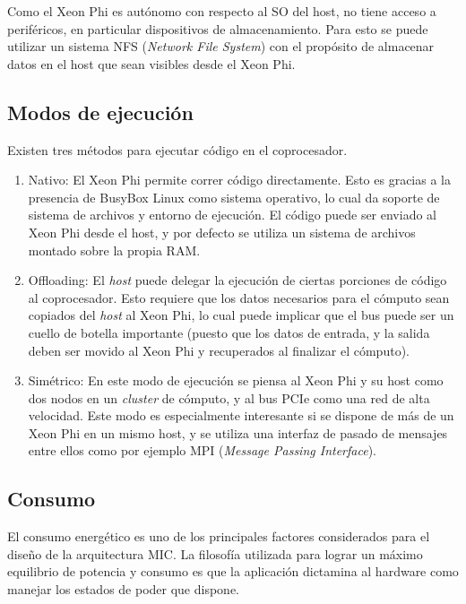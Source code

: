 Como el Xeon Phi es aut\'onomo con respecto al SO del host, no tiene acceso a perif\'ericos, en particular dispositivos de almacenamiento.
Para esto se puede utilizar un sistema NFS (\textit{Network File System}) con el prop\'osito de almacenar datos en el host que sean visibles
desde el Xeon Phi.

\subsection{Modos de ejecuci\'on}

Existen tres m\'etodos para ejecutar c\'odigo en el coprocesador.

\begin{enumerate}
    \item Nativo: El Xeon Phi permite correr c\'odigo directamente. Esto es gracias a la presencia de BusyBox Linux como sistema operativo,
    lo cual da soporte de sistema de archivos y entorno de ejecuci\'on. El c\'odigo puede ser enviado al Xeon Phi desde el host, y por defecto se utiliza un sistema
    de archivos montado sobre la propia RAM.
    \item Offloading: El \textit{host} puede delegar la ejecuci\'on de ciertas porciones de c\'odigo al coprocesador.
    Esto requiere que los datos necesarios para el c\'omputo sean copiados del \textit{host} al Xeon Phi, lo cual puede implicar que el bus puede ser un cuello de botella
    importante (puesto que los datos de entrada, y la salida deben ser movido al Xeon Phi y recuperados al finalizar el c\'omputo).
    \item Sim\'etrico: En este modo de ejecuci\'on se piensa al Xeon Phi y su host como dos nodos en un \textit{cluster} de c\'omputo, y al bus PCIe como una red de alta velocidad.
    Este modo es especialmente interesante si se dispone de m\'as de un Xeon Phi en un mismo host,
    y se utiliza una interfaz de pasado de mensajes entre ellos como por ejemplo MPI (\textit{Message Passing Interface}).
\end{enumerate}

\subsection{Consumo}

El consumo energ\'etico es uno de los principales factores considerados para el dise\~no de la arquitectura MIC. La filosof\'ia
utilizada para lograr un m\'aximo equilibrio de potencia y consumo es que la aplicaci\'on dictamina al hardware como
manejar los estados de poder que dispone.

